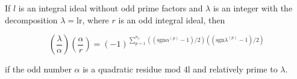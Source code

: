If $l$ is an integral ideal without odd prime factors and $\lambda$ is an integer with the decomposition $\lambda = \text{lr}$, where $r$ is an odd integral ideal, then

$$\left( \frac{\lambda}{\alpha} \right) \left( \frac{\alpha}{r} \right) = (-1)^{\sum_{p=1}^{n_1} ((\text{sgn} \alpha^{(p)} - 1)/2)((\text{sgn} \lambda^{(p)} - 1)/2)}$$

if the odd number $\alpha$ is a quadratic residue mod 4l and relatively prime to $\lambda$.
